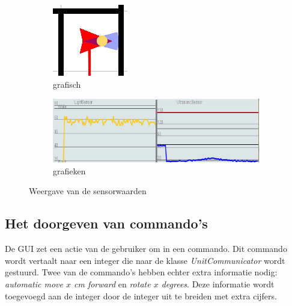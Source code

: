 \documentclass[eind]{penoverslag}
\begin{document}
\begin{figure}
        \centering
        \begin{subfigure}[hb]{0.25\textwidth}
                \centering
                \includegraphics[width=\textwidth]{guiRobot}
                \caption{grafisch}
        \end{subfigure}%
        \begin{subfigure}[hb]{0.75\textwidth}
                \centering
                \includegraphics[width=\textwidth]{guiSensor}
                \caption{grafieken}
        \end{subfigure}
 \caption{Weergave van de sensorwaarden}
\label{fig:guiSensoren}
\end{figure}

\subsection{Het doorgeven van commando's} %
\label{ssec:commands}
De GUI zet een actie van de gebruiker om in een commando. Dit commando wordt vertaalt naar een integer die naar de klasse \textit{UnitCommunicator} wordt gestuurd. Twee van de commando's hebben echter extra informatie nodig: \textit{automatic move $x$ cm forward} en \textit{rotate $x$ degrees}. Deze informatie wordt toegevoegd aan de integer door de integer uit te breiden met extra cijfers.\\
\end{document}
